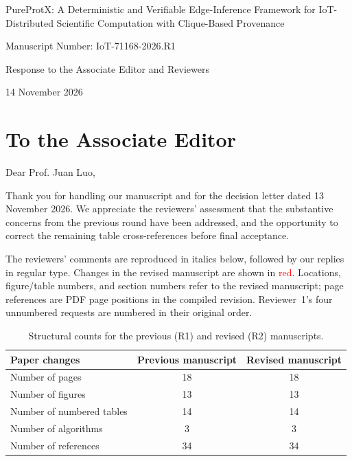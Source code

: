 \documentclass[11pt]{article}
\begin{document}
\hypersetup{pageanchor=false}
\begin{titlepage}
\centering
\vspace*{\fill}
{\Large PureProtX: A Deterministic and Verifiable Edge-Inference Framework
for IoT-Distributed Scientific Computation with Clique-Based Provenance\par}
\vspace{0.6cm}
{\large Manuscript Number: IoT-71168-2026.R1\par}
\vspace{0.6cm}
{\large Response to the Associate Editor and Reviewers\par}
\vspace{0.6cm}
{14 November 2026\par}
\vspace*{\fill}
\end{titlepage}
\hypersetup{pageanchor=true}

\section*{To the Associate Editor}
Dear Prof. Juan Luo,

Thank you for handling our manuscript and for the decision letter dated
13 November 2026. We appreciate the reviewers' assessment that the
substantive concerns from the previous round have been addressed, and the
opportunity to correct the remaining table cross-references before final
acceptance.

The reviewers' comments are reproduced in italics below, followed by our
replies in regular type. Changes in the revised manuscript are shown in
\textcolor{red}{red}. Locations, figure/table numbers, and section numbers
refer to the revised manuscript; page references are PDF page positions in
the compiled revision. Reviewer~1's four unnumbered requests are numbered
in their original order.

\begin{table}[!htbp]
\centering
\caption{Structural counts for the previous (R1) and revised (R2) manuscripts.}
\begin{tabular}{lcc}
\toprule
Paper changes & Previous manuscript & Revised manuscript \\
\midrule
Number of pages & 18 & 18 \\
Number of figures & 13 & 13 \\
Number of numbered tables & 14 & 14 \\
Number of algorithms & 3 & 3 \\
Number of references & 34 & 34 \\
\bottomrule
\end{tabular}
\end{table}
\end{document}
